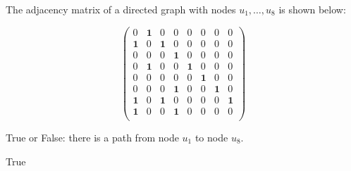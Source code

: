 \begin{prob}

    The adjacency matrix of a directed graph with nodes $u_1, \ldots, u_8$ is shown below:

    \[
        \begin{pmatrix}
            0 & \textbf{1} & 0 & 0 & 0 & 0 & 0 & 0 \\
            \textbf{1} & 0 & \textbf{1} & 0 & 0 & 0 & 0 & 0 \\
            0 & 0 & 0 & \textbf{1} & 0 & 0 & 0 & 0 \\
            0 & \textbf{1} & 0 & 0 & \textbf{1} & 0 & 0 & 0 \\
            0 & 0 & 0 & 0 & 0 & \textbf{1} & 0 & 0 \\
            0 & 0 & 0 & \textbf{1} & 0 & 0 & \textbf{1} & 0 \\
            \textbf{1} & 0 & \textbf{1} & 0 & 0 & 0 & 0 & \textbf{1} \\
            \textbf{1} & 0 & 0 & \textbf{1} & 0 & 0 & 0 & 0 \\
        \end{pmatrix}
    \]

    True or False: there is a path from node $u_1$ to node $u_8$.

    \Tf{}

    \begin{soln}
        True
    \end{soln}

\end{prob}
